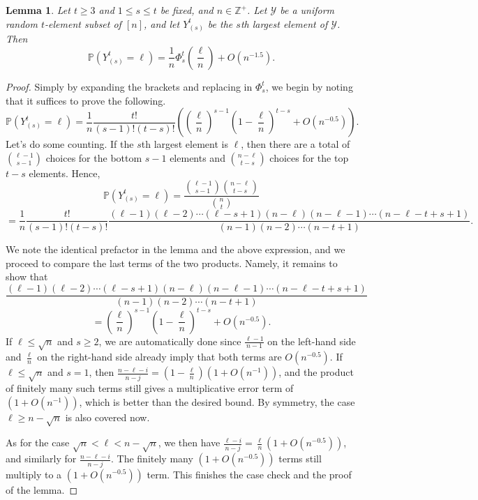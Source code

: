 \documentclass{amsart}
\newtheorem{lemma}[theorem]{Lemma}
\theoremstyle{definition}
\begin{document}
\begin{lemma}\label{lem:os}
Let $t\geq 3$ and $1\leq s\leq t$ be fixed, and $n\in \mathbb{Z}^+$. Let $\mathcal{Y}$ be a uniform random $t$-element subset of $[n]$, and let $Y_{(s)}^t$ be the $s$th largest element of $\mathcal{Y}$. Then
\[\mathbb{P}\left(Y_{(s)}^t=\ell\right)=\frac{1}{n}\Phi_s^t\left(\frac{\ell}{n}\right)+O(n^{-1.5}).\]
\end{lemma}
\begin{proof} Simply by expanding the brackets and replacing in $\Phi_s^t$, we begin by noting that it suffices to prove the following.
\[\mathbb{P}\left(Y_{(s)}^t=\ell\right)=\frac{1}{n}\frac{t!}{(s-1)!(t-s)!}\left(\left(\frac{\ell}{n}\right)^{s-1}\left(1-\frac{\ell}{n}\right)^{t-s}+O(n^{-0.5})\right).\]
Let's do some counting. If the $s$th largest element is $\ell$, then there are a total of $\binom{\ell-1}{s-1}$ choices for the bottom $s-1$ elements and $\binom{n-\ell}{t-s}$ choices for the top $t-s$ elements. Hence,
\[\mathbb{P}\left(Y_{(s)}^t=\ell\right)=\frac{\binom{\ell-1}{s-1}\binom{n-\ell}{t-s}}{\binom{n}{t}}\]\[=\frac{1}{n}\frac{t!}{(s-1)!(t-s)!}\frac{(\ell-1)(\ell-2)\cdots(\ell-s+1)(n-\ell)(n-\ell-1)\cdots(n-\ell-t+s+1)}{(n-1)(n-2)\cdots(n-t+1)}.\]

We note the identical prefactor in the lemma and the above expression, and we proceed to compare the last terms of the two products. Namely, it remains to show that
\[\frac{(\ell-1)(\ell-2)\cdots(\ell-s+1)(n-\ell)(n-\ell-1)\cdots(n-\ell-t+s+1)}{(n-1)(n-2)\cdots(n-t+1)}\]\[=\left(\frac{\ell}{n}\right)^{s-1}\left(1-\frac{\ell}{n}\right)^{t-s}+O(n^{-0.5}).\]
If $\ell\leq \sqrt{n}$ and $s\geq 2$, we are automatically done since $\frac{\ell-1}{n-1}$ on the left-hand side and $\frac{\ell}{n}$ on the right-hand side already imply that both terms are $O(n^{-0.5})$. If $\ell\leq \sqrt{n}$ and $s=1$, then $\frac{n-\ell-i}{n-j}=\left(1-\frac{\ell}{n}\right)\left(1+O(n^{-1})\right)$, and the product of finitely many such terms still gives a multiplicative error term of $(1+O(n^{-1}))$, which is better than the desired bound. By symmetry, the case $\ell\geq n-\sqrt{n}$ is also covered now.

As for the case $\sqrt{n}< \ell<n-\sqrt{n}$, we then have $\frac{\ell-i}{n-j}=\frac{\ell}{n}(1+O(n^{-0.5}))$, and similarly for $\frac{n-\ell-i}{n-j}$. The finitely many $(1+O(n^{-0.5}))$ terms still multiply to a $(1+O(n^{-0.5}))$ term. This finishes the case check and the proof of the lemma.
\end{proof}
\end{document}
